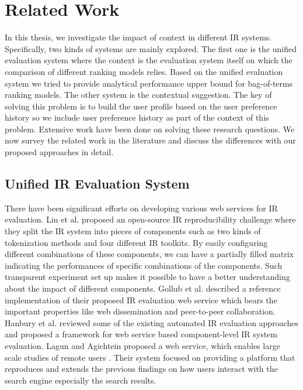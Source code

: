 %
%
\chapter{Related Work}

In this thesis, we investigate the impact of context in different IR systems. 
Specifically, two kinds of systems are mainly explored. 
The first one is the unified evaluation system where the context is the 
evaluation system itself on which the comparison of different ranking models 
relies. Based on the unified evaluation system we tried to provide analytical 
performance upper bound for bag-of-terms ranking models. 
The other system is the contextual suggestion. The key of solving this 
problem is to build the user profile based on the user preference history 
so we include user preference history as part of the context of this problem. 
Extensive work have been done on solving these research questions. 
We now survey the related work in the literature and discuss the differences
with our proposed approaches in detail.


\section{Unified IR Evaluation System}

There have been significant efforts on developing various web 
services for IR evaluation. 
Lin et al. \cite{conf/ecir/LinCTCCFIMV16} proposed an open-source 
IR reproducibility challenge where they split the IR system into 
pieces of components such as two kinds of tokenization methods and 
four different IR toolkits. 
By easily configuring different combinations of these components, we 
can have a partially filled matrix indicating the performances of 
specific combinations of the components. Such transparent 
experiment set up makes it possible to have a better understanding about 
the impact of different components. 
Gollub et al. \cite{Gollub:2012:OIT:2348283.2348501} described a reference 
implementation of their proposed IR evaluation web service which bears 
the important properties like web dissemination and peer-to-peer 
collaboration. 
Hanbury et al. \cite{Hanbury:2010:ACE:1889174.1889194} reviewed some 
of the existing automated IR evaluation approaches and proposed a 
framework for web service based component-level IR system evaluation. 
Lagun and Agichtein proposed a web service, which enables large scale 
studies of remote users \cite{Lagun:2011:VEL:2009916.2009967}. 
Their system focused on providing a platform that reproduces and 
extends the previous findings on how users interact with the 
search engine especially the search results. 

